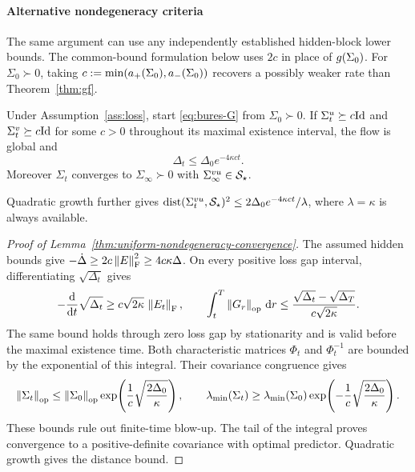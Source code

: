 \paragraph{Alternative nondegeneracy criteria}
The same argument can use any independently established hidden-block
lower bounds. The common-bound formulation below uses $2c$ in place of
$g(\Sigma_0)$. For $\Sigma_0\succ0$, taking
$c:=\min(a_+(\Sigma_0),a_-(\Sigma_0))$ recovers a possibly weaker
rate than Theorem~\ref{thm:gf}.

\begin{lemma}
\label{thm:uniform-nondegeneracy-convergence}
Under Assumption~\ref{ass:loss}, start \eqref{eq:bures-G} from
$\Sigma_0\succ0$. If $\Sigma^u_t\succeq c\mathrm{Id}$ and $\Sigma^v_t\succeq c\mathrm{Id}$
for some $c>0$ throughout its maximal existence interval, the flow is
global and
\begin{equation}
\label{eq:uniform-nondegeneracy-energy-rate}
\Delta_t\le\Delta_0e^{-4\kappa ct}.
\end{equation}
Moreover $\Sigma_t$ converges to $\Sigma_\infty\succ0$ with
$\Sigma^{vu}_\infty\in\mathcal S_\star$.
\end{lemma}

Quadratic growth further gives
$\operatorname{dist}(\Sigma^{vu}_t,\mathcal S_\star)^2\le2\Delta_0e^{-4\kappa ct}/\lambda$,
where $\lambda=\kappa$ is always available.

\begin{proof}[Proof of Lemma~\ref{thm:uniform-nondegeneracy-convergence}]
The assumed hidden bounds give
$-\dot\Delta\ge2c\left\lVert E \right\rVert_{\mathrm{F}}^2\ge4c\kappa\Delta$.
On every positive loss gap interval, differentiating $\sqrt{\Delta_t}$ gives
\[
 -\frac{\mathrm{d}}{\mathrm{d}t}\sqrt{\Delta_t}
 \ge c\sqrt{2\kappa}\,\left\lVert E_t \right\rVert_{\mathrm{F}},\qquad
 \int_t^T\left\lVert G_r \right\rVert_{\mathrm{op}}\,\mathrm{d}r
 \le\frac{\sqrt{\Delta_t}-\sqrt{\Delta_T}}{c\sqrt{2\kappa}}.
\]
The same bound holds through zero loss gap by stationarity and is valid
before the maximal existence time.
Both characteristic matrices $\Phi_t$ and $\Phi_t^{-1}$ are bounded by
the exponential of this integral. Their covariance congruence gives
\begin{equation}\label{eq:uniform-nondegeneracy-covariance-bounds}
 \left\lVert \Sigma_t \right\rVert_{\mathrm{op}}\le\left\lVert \Sigma_0 \right\rVert_{\mathrm{op}}
  \exp\!\left(\frac1c\sqrt{\frac{2\Delta_0}{\kappa}}\right),\qquad
 \lambda_{\min}(\Sigma_t)\ge\lambda_{\min}(\Sigma_0)
  \exp\!\left(-\frac1c\sqrt{\frac{2\Delta_0}{\kappa}}\right).
\end{equation}
These bounds rule out finite-time blow-up. The tail of the integral proves convergence to a
positive-definite covariance with optimal predictor.
Quadratic growth gives the distance bound.
\end{proof}

